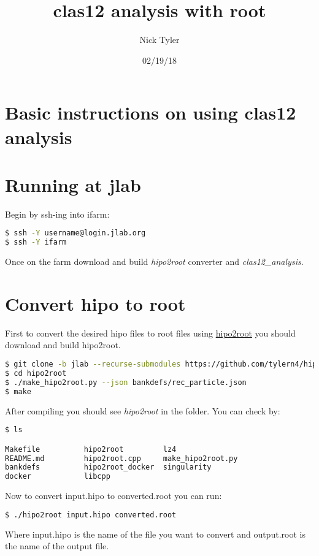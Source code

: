 \documentclass[a4paper]{article}
\title{clas12 analysis with root}
\author{Nick Tyler}
\date{02/19/18}
\begin{document}
\maketitle

\section*{Basic instructions on using clas12 analysis}

\section{Running at jlab}

Begin by ssh-ing into ifarm:
\begin{lstlisting}[language=bash]
$ ssh -Y username@login.jlab.org
$ ssh -Y ifarm
\end{lstlisting}

Once on the farm download and build \emph{hipo2root} converter and \emph{clas12\_analysis}. 

\section{Convert hipo to root}
First to convert the desired hipo files to root files using \href{https://github.com/tylern4/hipo2root.git}{hipo2root} you should download and build hipo2root.

\begin{lstlisting}[language=bash]
$ git clone -b jlab --recurse-submodules https://github.com/tylern4/hipo2root.git
$ cd hipo2root
$ ./make_hipo2root.py --json bankdefs/rec_particle.json
$ make
\end{lstlisting}

After compiling you should see \emph{hipo2root} in the folder. You can check by:
\begin{lstlisting}[language=bash]
$ ls

Makefile          hipo2root         lz4
README.md         hipo2root.cpp     make_hipo2root.py
bankdefs          hipo2root_docker  singularity
docker            libcpp
\end{lstlisting}

Now to convert input.hipo to converted.root you can run:
\begin{lstlisting}[language=bash]
$ ./hipo2root input.hipo converted.root
\end{lstlisting}

Where input.hipo is the name of the file you want to convert and output.root is the name of the output file.
\end{document}
